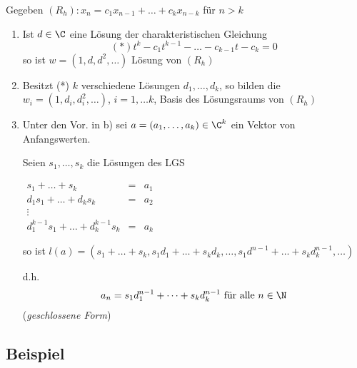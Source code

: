 Gegeben $(R_h) : x_n = c_1x_{n-1} + \dots + c_kx_{n-k}$ für $n > k$

\begin{enumerate}
	\item Ist $d\in\C$ eine Lösung der charakteristischen Gleichung 
	\[ (*) t^k - c_1t^{k-1} - \dots - c_{k-1}t - c_k = 0 \]
	so ist $w = (1, d, d^2, \dots)$ Lösung von $(R_h)$
	
	\item
	Besitzt (*) $k$ verschiedene Lösungen $d_1, \dots, d_k$, so bilden die $w_i = (1, d_i, d_i^2, \dots)$, $i = 1, \dots k$, Basis des Lösungsraums von $(R_h)$
	
	\item
	Unter den Vor. in b) sei $a = (a_1, \dots, a_k) \in \C^k$ ein Vektor von Anfangswerten.
	
	Seien $s_1, \dots, s_k$
 die Lösungen des LGS
 
	$\begin{array}{lcl}
	s_1 + \dots + s_k &=& a_1 \\
	d_1s_1 + \dots + d_ks_k &=& a_2 \\
	\vdots \\
	d_1^{k-1}s_1 + \dots + d_k^{k-1}s_k &=& a_k
	\end{array}$
	
	so ist $l(a) = (s_1 + \dots + s_k, s_1d_1 + \dots + s_kd_k, \dots, s_1d^{n-1} + \dots + s_kd_k^{n-1}, \dots)$

	d.h. \[ a_n = s_1d_1^{n-1} + \dots + s_kd_k^{n-1} \text{ für alle } n \in \N \]
	(\emph{geschlossene Form})
	
	
\end{enumerate}

\subsection{Beispiel} %


